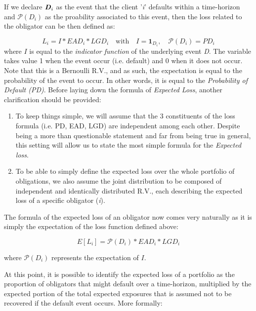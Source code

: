 \documentclass[a4paper,12pt]{article}
\begin{document}
    If we declare $\textbf{\textit{D}}_{i}$ as the event that the client '\textit{i}' defaults within a time-horizon and $\mathcal{P}(D_{i})$ as the proability associated to this event, then 
    the loss related to the obligator can be then defined as:
    
    \begin{equation}
        L_{i}=I*EAD_{i}*LGD_{i} \quad\mathrm{with}\quad  I = \mathrm{\textbf{1}}_{D_{i}}, \quad\mathcal{P}(D_{i}) = PD_{i}
    \end{equation}
    where $I$ is equal to the \textit{indicator function} of the underlying event \textit{D}. The variable takes value 1 when the 
    event occur (i.e. default) and 0 when it does not occur. Note that this is a Bernoulli R.V., and as such, the expectation is equal to the probability of the event to occur. In other words, it is equal to the \textit{Probability of Default (PD)}. 
    Before laying down the formula of \textit{Expected Loss}, another clarification should be provided:
    
    \begin{enumerate}
        \item To keep things simple, we will assume that the 3 constituents of the loss formula (i.e. PD, EAD, LGD) are independent among each other. Despite being a more than questionable statement and far from being true in general, this setting will allow us to state the most simple formula for the \textit{Expected loss}.
        \item To be able to simply define the expected loss over the whole portfolio of obligations, we also assume the joint distribution to be composed of independent and identically distributed R.V., each describing the expected loss of a specific obligator (\textit{i}).
    \end{enumerate}

    The formula of the expected loss of an obligator now comes very naturally as it is simply the expectation of the loss function defined above:

        \begin{equation}
            E[L_{i}]=\mathcal{P}(D_{i})*EAD_{i}*LGD_{i}
        \end{equation}
    
    where $\mathcal{P}(D_{i})$ represents the expectation of $I$.

    At this point, it is possible to identify the expected loss of a portfolio as the proportion of obligators that might default over a time-horizon,
    multiplied by the expected portion of the total expected exposures that is assumed not to be recovered if the default event occurs. More formally:
\end{document}
